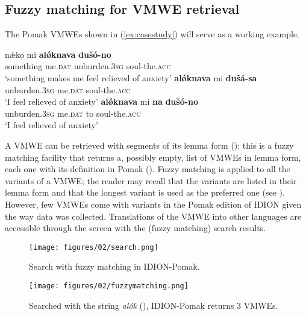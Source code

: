 \documentclass[output=paper,colorlinks,citecolor=brown]{langscibook}
\begin{document}
\subsection{Fuzzy matching for VMWE retrieval}
\label{sec:fuzzy}


The Pomak VMWEs shown in (\ref{ex:casestudy}) will serve as a working example. 


\ea
\label{ex:casestudy}
\begin{xlist}
\ex 
\label{ex:casecausative}
\gll nǽko mi \textbf{alǿknava}   \textbf{dušó-no}\\
something me.\textsc{dat} unburden.\textsc{3sg}   soul-the.\textsc{acc} \\
\glt `something makes me feel relieved of anxiety'
\ex
\label{ex:casesinchoative}
\gll  \textbf{alǿknava} mi \textbf{dušá-sa }\\
unburden.\textsc{3sg} me.\textsc{dat}  soul-the.\textsc{acc} \\
\glt `I feel relieved of anxiety'
\ex
\label{ex:caseverbalter}
\gll  \textbf{alǿknava}  mi \textbf{na} \textbf{dušó-no}\\
unburden.\textsc{3sg} me.\textsc{dat} to soul-the.\textsc{acc} \\
\glt `I feel relieved of anxiety'
\end{xlist}
\z

 A VMWE can be retrieved with segments of its lemma form (); this is a fuzzy matching facility that returns a, possibly empty, list of VMWEs in lemma form, each one with its definition in Pomak (). Fuzzy matching is applied to all the variants of a VMWE; the reader may recall that the variants are listed in their lemma form and that the longest variant is used as the preferred one (see ).   However, few VMWEs come with variants in the Pomak edition of IDION  given the way data was collected. Translations of the VMWE into other languages are accessible through the screen with the (fuzzy matching) search results.
 
\vfill
\begin{figure}[h]
\texttt{[image: figures/02/search.png]}
\caption{Search with fuzzy matching in IDION-Pomak.}
\label{fig:chapterhandle:search}
\end{figure}
\vfill
\begin{figure}[H]
\texttt{[image: figures/02/fuzzymatching.png]}
\caption{Searched with the string \textit{alǿk} (), IDION-Pomak returns 3 VMWEs.}
\label{fig:chapterhandle:fuzzymatching}
\end{figure}
\vfill\pagebreak
\end{document}
